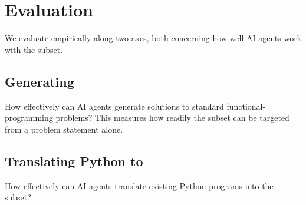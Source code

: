 \section{Evaluation}
\label{sec:evaluation}

We evaluate \PurePy empirically along two axes, both concerning how well AI agents work with the subset.

\subsection{Generating \PurePy}
\label{sec:eval-generate}

How effectively can AI agents generate \PurePy solutions to standard functional-programming problems? This
measures how readily the subset can be targeted from a problem statement alone.

\subsection{Translating Python to \PurePy}
\label{sec:eval-translate}

How effectively can AI agents translate existing Python programs into the \PurePy subset? 
